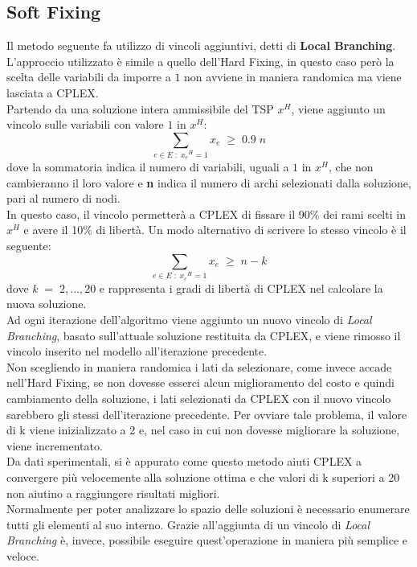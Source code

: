 \subsection{Soft Fixing}\label{soft fixing} %
Il metodo seguente fa utilizzo di vincoli aggiuntivi, detti di \textbf{Local Branching}. L'approccio utilizzato è simile a quello dell'Hard Fixing, in questo caso però la scelta delle variabili da imporre a $1$ non avviene in maniera randomica ma viene lasciata a CPLEX.\\
Partendo da una soluzione intera ammissibile del TSP $x^H$, viene aggiunto un vincolo sulle variabili con valore $1$ in $x^H$:\\
$$\underset{e\in E\; : \; {x_e}^{H}=1}\sum{x_e}\;\geq\; 0.9\;n$$
dove la sommatoria indica il numero di variabili, uguali a $1$ in $x^H$, che non cambieranno il loro valore e \textbf{n} indica il numero di archi selezionati dalla soluzione, pari al numero di nodi.\\
In questo caso, il vincolo permetterà a CPLEX di fissare il 90\% dei rami scelti in $x^H$ e avere il 10\% di libertà.
Un modo alternativo di scrivere lo stesso vincolo è il seguente:
$$\underset{e\in E\; : \; {x_e}^{H}=1}\sum{x_e}\;\geq\; n-k$$
dove $k\;=\;2,...,20$ e rappresenta i gradi di libertà di CPLEX nel calcolare la nuova soluzione.\\
Ad ogni iterazione dell'algoritmo viene aggiunto un nuovo vincolo di \textit{Local Branching}, basato sull'attuale soluzione restituita da CPLEX, e viene rimosso il vincolo inserito nel modello all'iterazione precedente.\\
Non scegliendo in maniera randomica i lati da selezionare, come invece accade nell'Hard Fixing, se non dovesse esserci alcun miglioramento del costo e quindi cambiamento della soluzione, i lati selezionati da CPLEX con il nuovo vincolo sarebbero gli stessi dell'iterazione precedente. Per ovviare tale problema, il valore di k viene inizializzato a 2 e, nel caso in cui non dovesse migliorare la soluzione, viene incrementato.\\
Da dati sperimentali, si è appurato come questo metodo aiuti CPLEX a convergere più velocemente alla soluzione ottima e che valori di k superiori a 20 non aiutino a raggiungere risultati migliori.\\
Normalmente per poter analizzare lo spazio delle soluzioni è necessario enumerare tutti gli elementi al suo interno. Grazie all'aggiunta di un vincolo di \textit{Local Branching} è, invece, possibile eseguire quest'operazione in maniera più semplice e veloce.\\ 
